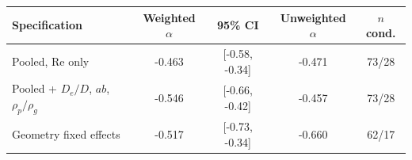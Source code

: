 \begin{tabular}{lcccc}\toprule Specification & Weighted $\alpha$ & 95\% CI & Unweighted $\alpha$ & $n$ cond. \\\midrule
Pooled, Re only & -0.463 & [-0.58, -0.34] & -0.471 & 73/28\\
Pooled + $D_e/D$, $ab$, $\rho_p/\rho_g$ & -0.546 & [-0.66, -0.42] & -0.457 & 73/28\\
Geometry fixed effects & -0.517 & [-0.73, -0.34] & -0.660 & 62/17\\
\bottomrule\end{tabular}